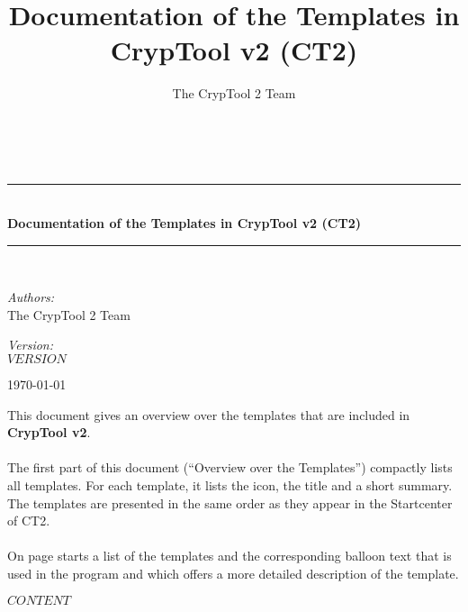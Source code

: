 \documentclass[10pt,a4paper]{scrreprt}
\title{Documentation of the Templates in CrypTool v2 (CT2)}
\author{The CrypTool 2 Team}
\newcommand{\HRule}{\rule{\linewidth}{0.5mm}}
\begin{document}
\begin{titlepage}
\begin{center}
\hspace{0pt}\\[2.5cm]

\HRule \\[0.4cm]
{ \huge \bfseries Documentation of the Templates in CrypTool v2 (CT2) }\\[0.4cm]
\HRule \\[1.5cm]

\begin{minipage}{0.4\textwidth}
\begin{flushleft} \large
\emph{Authors:} \\
The CrypTool 2 Team
\end{flushleft}
\end{minipage}
\begin{minipage}{0.4\textwidth}
\begin{flushright} \large
\emph{Version:} \\
$VERSION$
\end{flushright}
\end{minipage}
\vfill
{\large \today}
\end{center}
\newpage
\large
This document gives an overview over the templates that are included in {\bf CrypTool v2}.\\\\
The first part of this document (``Overview over the Templates'') compactly lists all templates. For each template, it lists the icon, the title and a short summary. The templates are presented in the same order as they appear in the Startcenter of CT2.\\\\
On page \pageref{part2} starts a list of the templates and the corresponding balloon text that is used in the program and which offers a more detailed description of the template.
\newpage
\end{titlepage}

\tableofcontents
\newpage

$CONTENT$
\end{document}
